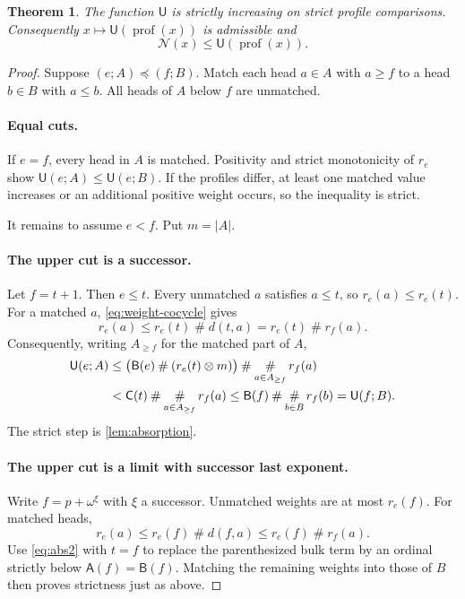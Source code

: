 \documentclass[11pt,a4paper]{article}
\newtheorem{theorem}{Theorem}[section]
\theoremstyle{definition}
\newcommand{\ns}{\mathbin{\#}}
\newcommand{\nprod}{\mathbin{\otimes}}
\newcommand{\bigns}{\mathop{\#}\displaylimits}
\newcommand{\OpN}{\mathcal N}
\newcommand{\FunA}{\mathsf A}
\newcommand{\FunB}{\mathsf B}
\newcommand{\FunC}{\mathsf C}
\newcommand{\FunU}{\mathsf U}
\newcommand{\dd}[2]{d(#1,#2)}
\newcommand{\prof}{\operatorname{prof}}
\begin{document}
\begin{theorem}\label{thm:upper}
The function $\FunU$ is strictly increasing on strict profile comparisons.
Consequently $x\mapsto\FunU(\prof(x))$ is admissible and
\begin{equation}\label{eq:NleU}
 \OpN(x)\le\FunU(\prof(x)).
\end{equation}
\end{theorem}
\begin{proof}
Suppose $(e;A)\preceq(f;B)$. Match each head $a\in A$ with $a\ge f$ to a
head $b\in B$ with $a\le b$. All heads of $A$ below $f$ are unmatched.

\paragraph{Equal cuts.}
If $e=f$, every head in $A$ is matched. Positivity and strict monotonicity of
$r_e$ show $\FunU(e;A)\le\FunU(e;B)$. If the profiles differ, at least one
matched value increases or an additional positive weight occurs, so the
inequality is strict.

It remains to assume $e<f$. Put $m=|A|$.

\paragraph{The upper cut is a successor.}
Let $f=t+1$. Then $e\le t$. Every unmatched $a$ satisfies $a\le t$, so
$r_e(a)\le r_e(t)$. For a matched $a$, \eqref{eq:weight-cocycle} gives
\[
 r_e(a)\le r_e(t)\ns\dd{t}{a}
          =r_e(t)\ns r_f(a).
\]
Consequently, writing $A_{\ge f}$ for the matched part of $A$,
\begin{align*}
 \FunU(e;A)
 &\le\bigl(\FunB(e)\ns(r_e(t)\nprod m)\bigr)
                       \ns\bigns_{a\in A_{\ge f}}r_f(a)\\
 &<\FunC(t)\ns\bigns_{a\in A_{\ge f}}r_f(a)
 \le\FunB(f)\ns\bigns_{b\in B}r_f(b)=\FunU(f;B).
\end{align*}
The strict step is \cref{lem:absorption}.

\paragraph{The upper cut is a limit with successor last exponent.}
Write $f=p+\omega^\xi$ with $\xi$ a successor.
Unmatched weights are at most $r_e(f)$. For matched heads,
\[
 r_e(a)\le r_e(f)\ns\dd{f}{a}
          \le r_e(f)\ns r_f(a).
\]
Use \eqref{eq:abs2} with $t=f$ to replace the parenthesized bulk term by an
ordinal strictly below $\FunA(f)=\FunB(f)$. Matching the remaining weights
into those of $B$ then proves strictness just as above.


\end{proof}
\end{document}
